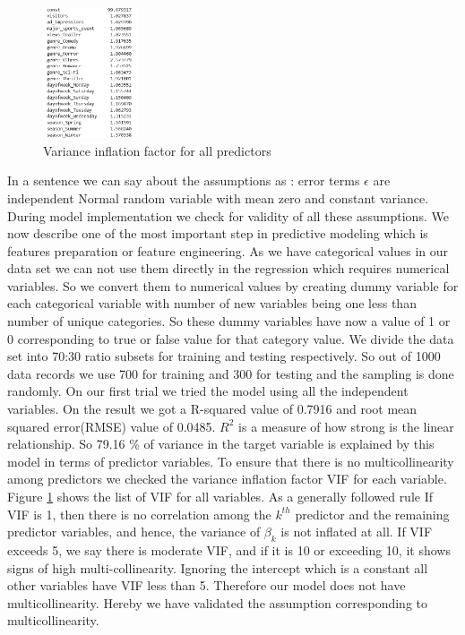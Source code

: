 \documentclass[12pt,a4paper]{style}
\begin{document}
	\begin{figure}
	\includegraphics[width=0.25\textwidth]{VIF.png}
	\vspace{-4mm} %
	\caption{\small{Variance inflation factor for all predictors}}
	\label{fig:VIF}
	\end{figure}
	In a sentence we can say about the assumptions as : error terms $\epsilon$ are independent Normal random variable with mean zero and constant variance. During model implementation we check for validity of all these assumptions. We now describe one of the most important step in predictive modeling which is features preparation or feature engineering. As we have categorical values in our data set we can not use them directly in the regression which requires numerical variables. So we convert them to numerical values by creating dummy variable for each categorical variable with number of new variables being one less than number of unique categories. So these dummy variables have now a value of 1 or 0 corresponding to true or false value for that category value. We divide the data set into 70:30 ratio subsets for training and testing respectively. So out of 1000 data records we use 700 for training and 300 for testing and the sampling is done randomly.  
	On our first trial we tried the model using all the independent variables. On the result we got a R-squared value of 0.7916 and root mean squared error(RMSE) value of 0.0485. $R^2$ is a measure of how strong is the linear relationship. So 79.16 \% of variance in the target variable is explained by this model in terms of predictor variables. To ensure that there is no multicollinearity among predictors we checked the variance inflation factor VIF for each variable. Figure \ref{fig:VIF} shows the list of VIF for all variables. As a generally followed rule If VIF is 1, then there is no correlation among the $k^{th}$ predictor and the remaining predictor variables, and hence, the variance of $\beta_k$ is not inflated at all. If VIF exceeds 5, we say there is moderate VIF, and if it is 10 or exceeding 10, it shows signs of high multi-collinearity. Ignoring the intercept which is a constant all other variables have VIF less than 5. Therefore our model does not have multicollinearity. Hereby we have validated the assumption corresponding to multicollinearity. 
	
\end{document}
